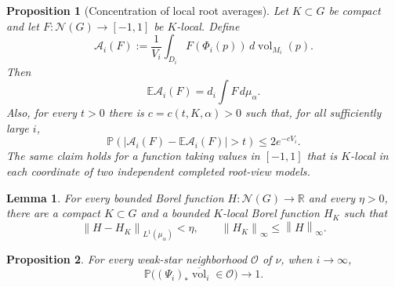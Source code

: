 \documentclass[10pt,a4paper]{amsart}
\newtheorem{proposition}{Proposition}
\newtheorem{lemma}{Lemma}
\newcommand{\abs}[1]{\left\lvert#1\right\rvert}
\newcommand{\cN}{\mathcal N}
\newcommand{\cO}{\mathcal O}
\newcommand{\dbar}{\overline{\vol}}
\newcommand{\dd}{\,d}
\newcommand{\norm}[1]{\left\lVert#1\right\rVert}
\newcommand{\vol}{\operatorname{vol}}
\begin{document}
\begin{proposition}[Concentration of local root averages]\label{prop:local-concentration}
Let $K\subset G$ be compact and let $F:\cN(G)\to[-1,1]$ be $K$-local. Define
\[
 \mathcal A_i(F):=\frac1{V_i}\int_{D_i}F(\Phi_i(p))\dd\vol_{M_i}(p).
\]
Then
\begin{equation}\label{eq:local-mean}
 \mathbb E\mathcal A_i(F)=d_i\int F\dd\mu_\alpha.
\end{equation}
Also, for every $t>0$ there is $c=c(t,K,\alpha)>0$ such that, for all sufficiently large $i$,
\begin{equation}\label{eq:local-concentration}
 \mathbb P\left(\abs{\mathcal A_i(F)-\mathbb E\mathcal A_i(F)}>t\right)
 \leq2e^{-cV_i}.
\end{equation}
The same claim holds for a function taking values in $[-1,1]$ that is
$K$-local in each coordinate of two independent completed root-view models.
\end{proposition}

\begin{lemma}\label{lem:local-L1}
For every bounded Borel function $H:\cN(G)\to\mathbb R$ and every $\eta>0$, there are a compact $K\subset G$ and a bounded $K$-local Borel function $H_K$ such that
\[
 \norm{H-H_K}_{L^1(\mu_\alpha)}<\eta,
 \qquad \norm{H_K}_\infty\leq\norm{H}_\infty.
\]
\end{lemma}

\begin{proposition}\label{prop:empirical-factor}
For every weak-star neighborhood $\cO$ of $\nu$, when $i \to \infty$,
\[
 \mathbb P\bigl((\Psi_i)_*\dbar_i\in\cO\bigr)\longrightarrow1.
\]
\end{proposition}
\end{document}
